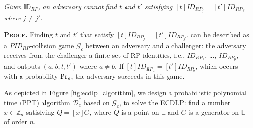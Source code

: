 \begin{lemma}
\emph{Given $\mathbb{ID}_{RP}$, an adversary cannot find $t$ and $t'$ satisfying $[t]ID_{RP_j} = [t']ID_{RP_{j'}}$ where $j \neq j'$.}\label{thm-rp-collision}
\end{lemma}

\noindent\textbf{\textsc{Proof.}} 
Finding $t$ and $t'$ that satisfy $[t]ID_{RP_j} = [t']ID_{RP_{j'}}$, can be described as a $PID_{RP}$-collision game $\mathcal{G}_c$ between an adversary and a challenger: the adversary receives from the challenger a finite set of RP identities, i.e., $ID_{RP_1}$, ..., $ID_{RP_p}$, and outputs $(a, b, t, t')$ where $a \neq b$. If $[t]ID_{RP_a}=[t']ID_{RP_b}$, which occurs with a probability ${\rm Pr}_s$, the adversary succeeds in this game.

As depicted in Figure \ref{fig:ecdlp_algorithm}, we design a probabilistic polynomial time (PPT) algorithm $\mathcal{D}^*_c$ based on $\mathcal{G}_c$, to solve the ECDLP: find a number $x \in \mathbb{Z}_n$ satisfying $Q = [x]G$, where $Q$ is a point on $\mathbb{E}$ and $G$ is a generator on $\mathbb{E}$ of order $n$.



